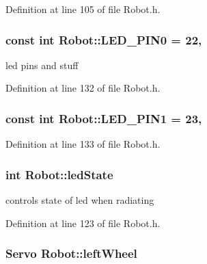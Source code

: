 Definition at line 105 of file Robot.\-h.

\hypertarget{classRobot_a431ea8916b52ddfddbe6d80a09fe71e0}{
\subsubsection[{L\-E\-D\-\_\-\-P\-I\-N0}]{\setlength{\rightskip}{0pt plus 5cm}const int Robot\-::\-L\-E\-D\-\_\-\-P\-I\-N0 = 22\hspace{0.3cm}{\ttfamily [static]}, {\ttfamily [private]}}}\label{classRobot_a431ea8916b52ddfddbe6d80a09fe71e0}
led pins and stuff 

Definition at line 132 of file Robot.\-h.

\hypertarget{classRobot_a4c6f4e38b77bf470d757ebea1b8c3cf0}{
\subsubsection[{L\-E\-D\-\_\-\-P\-I\-N1}]{\setlength{\rightskip}{0pt plus 5cm}const int Robot\-::\-L\-E\-D\-\_\-\-P\-I\-N1 = 23\hspace{0.3cm}{\ttfamily [static]}, {\ttfamily [private]}}}\label{classRobot_a4c6f4e38b77bf470d757ebea1b8c3cf0}


Definition at line 133 of file Robot.\-h.

\hypertarget{classRobot_a3c7308c71db125a8840f9c82b5fec9ca}{
\subsubsection[{led\-State}]{\setlength{\rightskip}{0pt plus 5cm}int Robot\-::led\-State\hspace{0.3cm}{\ttfamily [private]}}}\label{classRobot_a3c7308c71db125a8840f9c82b5fec9ca}


controls state of led when radiating 



Definition at line 123 of file Robot.\-h.

\hypertarget{classRobot_af357e059c6c07190c92c6c9a00e2b8af}{
\subsubsection[{left\-Wheel}]{\setlength{\rightskip}{0pt plus 5cm}Servo Robot\-::left\-Wheel\hspace{0.3cm}{\ttfamily [private]}}}\label{classRobot_af357e059c6c07190c92c6c9a00e2b8af}


